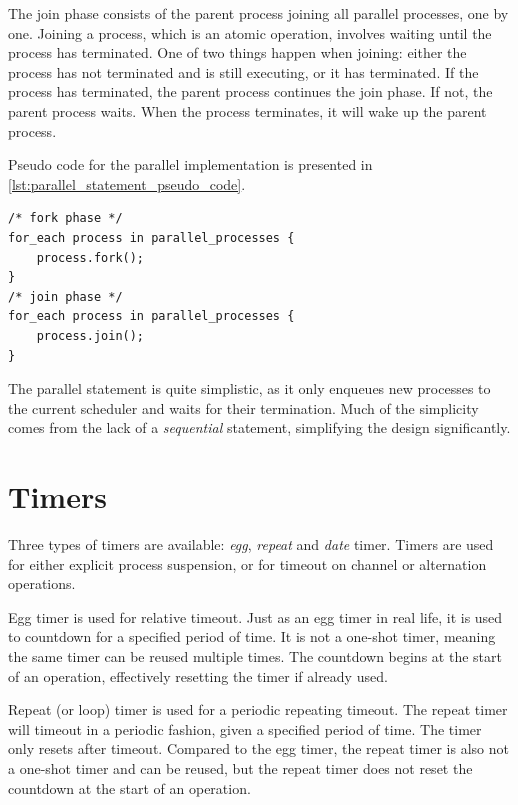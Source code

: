 The join phase consists of the parent process joining all parallel processes, one by one. Joining a process, which is an atomic operation, involves waiting until the process has terminated. One of two things happen when joining: either the process has not terminated and is still executing, or it has terminated. If the process has terminated, the parent process continues the join phase. If not, the parent process waits. When the process terminates, it will wake up the parent process.

Pseudo code for the parallel implementation is presented in \cref{lst:parallel_statement_pseudo_code}.

\begin{lstfloat}
\begin{lstlisting}[caption={Parallel statement pseudo code.}, label={lst:parallel_statement_pseudo_code}, style={CustomC++}, xleftmargin={4em}]
/* fork phase */
for_each process in parallel_processes {
    process.fork();
}
/* join phase */
for_each process in parallel_processes {
    process.join();
}
\end{lstlisting}
\end{lstfloat}

The parallel statement is quite simplistic, as it only enqueues new processes to the current scheduler and waits for their termination. Much of the simplicity comes from the lack of a \textit{sequential} statement, simplifying the design significantly. 


\FloatBarrier
\section{Timers}
\label{sec:timers}

Three types of timers are available: \textit{egg}, \textit{repeat} and \textit{date} timer. Timers are used for either explicit process suspension, or for timeout on channel or alternation operations. 

Egg timer is used for relative timeout. Just as an egg timer in real life, it is used to countdown for a specified period of time. It is not a one\hyp{}shot timer, meaning the same timer can be reused multiple times. The countdown begins at the start of an operation, effectively resetting the timer if already used.

Repeat (or loop) timer is used for a periodic repeating timeout. The repeat timer will timeout in a periodic fashion, given a specified period of time. The timer only resets after timeout. Compared to the egg timer, the repeat timer is also not a one\hyp{}shot timer and can be reused, but the repeat timer does not reset the countdown at the start of an operation.

